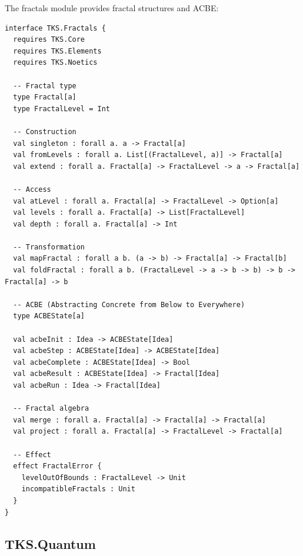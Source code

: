 \begin{definition}
\label{def:tks-fractals}
The fractals module provides fractal structures and ACBE:
\begin{verbatim}
interface TKS.Fractals {
  requires TKS.Core
  requires TKS.Elements
  requires TKS.Noetics

  -- Fractal type
  type Fractal[a]
  type FractalLevel = Int

  -- Construction
  val singleton : forall a. a -> Fractal[a]
  val fromLevels : forall a. List[(FractalLevel, a)] -> Fractal[a]
  val extend : forall a. Fractal[a] -> FractalLevel -> a -> Fractal[a]

  -- Access
  val atLevel : forall a. Fractal[a] -> FractalLevel -> Option[a]
  val levels : forall a. Fractal[a] -> List[FractalLevel]
  val depth : forall a. Fractal[a] -> Int

  -- Transformation
  val mapFractal : forall a b. (a -> b) -> Fractal[a] -> Fractal[b]
  val foldFractal : forall a b. (FractalLevel -> a -> b -> b) -> b -> Fractal[a] -> b

  -- ACBE (Abstracting Concrete from Below to Everywhere)
  type ACBEState[a]

  val acbeInit : Idea -> ACBEState[Idea]
  val acbeStep : ACBEState[Idea] -> ACBEState[Idea]
  val acbeComplete : ACBEState[Idea] -> Bool
  val acbeResult : ACBEState[Idea] -> Fractal[Idea]
  val acbeRun : Idea -> Fractal[Idea]

  -- Fractal algebra
  val merge : forall a. Fractal[a] -> Fractal[a] -> Fractal[a]
  val project : forall a. Fractal[a] -> FractalLevel -> Fractal[a]

  -- Effect
  effect FractalError {
    levelOutOfBounds : FractalLevel -> Unit
    incompatibleFractals : Unit
  }
}
\end{verbatim}
\end{definition}

\subsection{TKS.Quantum}
\label{subsec:tks-quantum}

